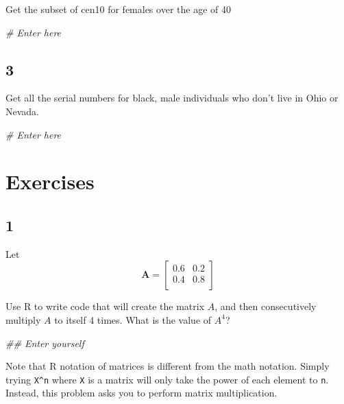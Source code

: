 \documentclass[
]{book}
\newenvironment{Shaded}{\begin{snugshade}}{\end{snugshade}}
\newcommand{\CommentTok}[1]{\textcolor[rgb]{0.56,0.35,0.01}{\textit{#1}}}
\theoremstyle{definition}
\theoremstyle{definition}
\theoremstyle{definition}
\theoremstyle{definition}
\theoremstyle{remark}
\begin{document}
Get the subset of cen10 for females over the age of 40

\begin{Shaded}
\begin{Highlighting}[]
\CommentTok{# Enter here}
\end{Highlighting}
\end{Shaded}

\hypertarget{section-5}{%
\subsection*{3}\label{section-5}}

Get all the serial numbers for black, male individuals who don't live in Ohio or Nevada.

\begin{Shaded}
\begin{Highlighting}[]
\CommentTok{# Enter here}
\end{Highlighting}
\end{Shaded}

\hypertarget{exercises-3}{%
\section*{Exercises}\label{exercises-3}}

\hypertarget{section-6}{%
\subsection*{1}\label{section-6}}

Let
\[\mathbf{A} = \left[\begin{array}
{rrr}
0.6 & 0.2\\
0.4 & 0.8\\
\end{array}\right]
\]

Use R to write code that will create the matrix \(A\), and then consecutively multiply \(A\) to itself 4 times. What is the value of \(A^{4}\)?

\begin{Shaded}
\begin{Highlighting}[]
\CommentTok{## Enter yourself}
\end{Highlighting}
\end{Shaded}

Note that R notation of matrices is different from the math notation. Simply trying \texttt{X\^{}n} where \texttt{X} is a matrix will only take the power of each element to \texttt{n}. Instead, this problem asks you to perform matrix multiplication.
\end{document}
